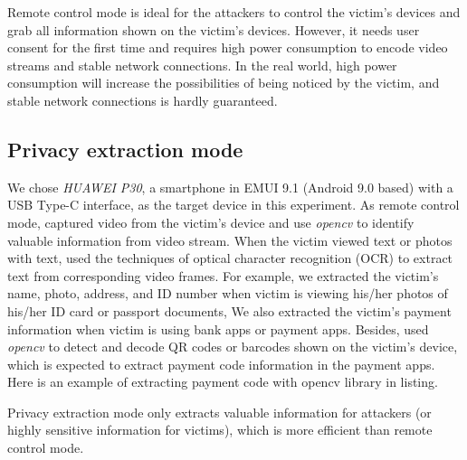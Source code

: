 Remote control mode is ideal for the attackers to control the victim's devices and grab all information shown on the victim's devices. 
However, it needs user consent for the first time and requires high power consumption to encode video streams and stable network connections.
In the real world, high power consumption will increase the possibilities of being noticed by the victim, and stable network connections is hardly guaranteed.


\subsection{Privacy extraction mode}
We chose \textit{HUAWEI P30}, a smartphone in EMUI 9.1 (Android 9.0 based) with a USB Type-C interface, as the target device in this experiment.
As remote control mode, \tool captured video from the victim's device and use \textit{opencv} to identify valuable information from video stream. 
When the victim viewed text or photos with text, \tool used the techniques of optical character recognition (OCR) to extract text from corresponding video frames. 
For example, we extracted the victim's name, photo, address, and ID number when victim is viewing his/her photos of his/her ID card or passport documents,
We also extracted the victim's payment information when victim is using bank apps or payment apps.
Besides, \tool used \textit{opencv} to detect and decode QR codes or barcodes shown on the victim's device, which is expected to extract payment code information in the payment apps.
Here is an example of extracting payment code with opencv library in listing. 

Privacy extraction mode only extracts valuable information for attackers (or highly sensitive information for victims), which is more efficient  than remote control mode.



